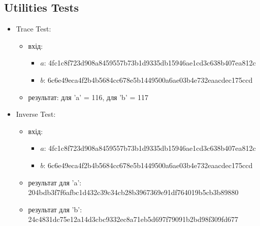 \documentclass{article}
\begin{document}
\subsection{Utilities Tests}
\begin{itemize}
    \item Trace Test:
        \begin{itemize}
            \item вхід: 
                \begin{itemize}
                    \item $a$: 4fc1c8f723d908a8459557b73b1d9335db15946ae1cd3c638b407ea812c
                    \item $b$: 6c6e49eca4f2b4b5684cc678e5b1449500a6ae03b4e732eaacdec175ccd
                \end{itemize}
            \item  результат: для 'a' = 116, для 'b' = 117
        \end{itemize}
    \item Inverse Test:
        \begin{itemize}
            \item вхід: 
                \begin{itemize}
                    \item $a$: 4fc1c8f723d908a8459557b73b1d9335db15946ae1cd3c638b407ea812c
                    \item $b$: 6c6e49eca4f2b4b5684cc678e5b1449500a6ae03b4e732eaacdec175ccd
                \end{itemize}
            \item результат для 'a': 204bdb3f7f6afbc1d432c39c34cb28b3967369e91df764019b5cb3b89880
            \item результат для 'b': 24c4831dc75e12a14d3cbc9332ec8a71eb5d697f79091b2bd98f309fd677
        \end{itemize}
\end{itemize}
\end{document}
